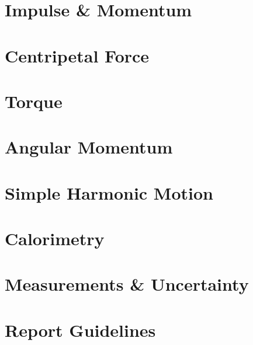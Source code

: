 \documentclass{book}
\theoremstyle{definition}
\begin{document}
\chapter{Impulse \& Momentum} \label{chap:Imp-Mom}
\setcounter{question}{0}


\chapter{Centripetal Force} \label{chap:Cen_Force}
\setcounter{question}{0}


\chapter{Torque} \label{chap:Torque}
\setcounter{question}{0}


\chapter{Angular Momentum} \label{chap:AngMom}
\setcounter{question}{0}


\chapter{Simple Harmonic Motion} \label{chap:Harmonics}
\setcounter{question}{0}


\chapter{Calorimetry} \label{chap:Calorimetry}
\setcounter{question}{0}


\appendix

\chapter{Measurements \& Uncertainty} \label{chap:Measurements}


\chapter{Report Guidelines} \label{chap:Report_Guidelines}

\end{document}
